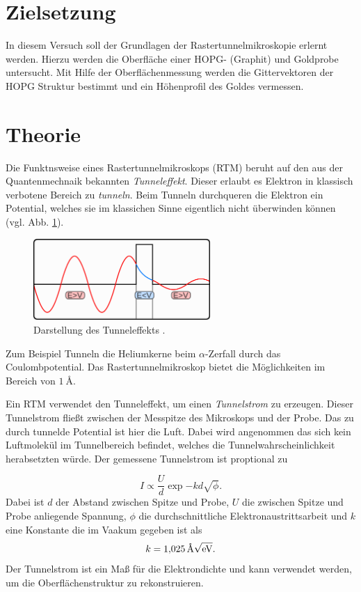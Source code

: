 \setcounter{page}{1}
\section*{Zielsetzung}
In diesem Versuch soll der Grundlagen der Rastertunnelmikroskopie
erlernt werden. Hierzu werden die Oberfläche einer HOPG- (Graphit) und
Goldprobe untersucht. Mit Hilfe der Oberflächenmessung werden die Gittervektoren
der HOPG Struktur bestimmt und ein Höhenprofil des Goldes vermessen.

\section{Theorie}
Die Funktnsweise eines  Rastertunnelmikroskops (RTM) beruht auf den aus der Quantenmechnaik bekannten
\emph{Tunneleffekt}. Dieser erlaubt es Elektron in klassisch verbotene Bereich zu \emph{tunneln}.
Beim Tunneln durchqueren die Elektron ein Potential, welches sie im klassichen Sinne
eigentlich nicht überwinden können (vgl. Abb. \ref{fig: tunneleffekt}).
\begin{figure}[!h]
  \centering
  \includegraphics[width=0.6\textwidth]{./pics/tunelleffekt.png}
  \caption{Darstellung des Tunneleffekts \cite{tunnel}.}
  \label{fig: tunneleffekt}
\end{figure}
Zum Beispiel Tunneln die Heliumkerne beim $\alpha$-Zerfall durch das Coulombpotential.
Das Rastertunnelmikroskop bietet die Möglichkeiten im Bereich von $\SI{1}{\angstrom}$.

Ein RTM verwendet den Tunneleffekt, um einen \emph{Tunnelstrom} zu erzeugen. Dieser Tunnelstrom
fließt zwischen der Messpitze des Mikroskops und der Probe. Das  zu durch tunnelde
Potential ist hier die Luft. Dabei wird angenommen das sich kein Luftmolekül im Tunnelbereich befindet, welches
die Tunnelwahrscheinlichkeit herabsetzten würde. Der gemessene Tunnelstrom ist proptional zu

\begin{equation}
  \label{eq: tunnelstrom}
I\propto \frac{U}{d}\exp{-kd\sqrt{\phi}}.
\end{equation}
Dabei ist $d$ der Abstand zwischen Spitze und Probe, $U$ die zwischen Spitze und Probe anliegende Spannung,
$\phi$ die durchschnittliche Elektronaustrittsarbeit und $k$ eine Konstante die im Vaakum gegeben ist als
\begin{equation*}
  k=\SI{1.025}{\per\angstrom\sqrt{\eV}}.
\end{equation*}
Der Tunnelstrom ist ein Maß für die Elektrondichte und kann verwendet werden, um die Oberflächenstruktur
zu rekonstruieren.

